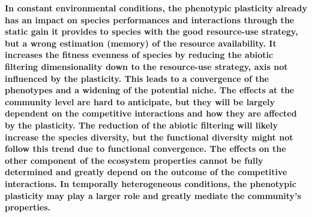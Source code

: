\begin{figure}\label{fig:rain_pl_effect}
    \classiccaptionstyle
{}
\end{figure}

\textbf{In constant environmental conditions, the phenotypic plasticity already has an impact on species performances and interactions through the static gain it provides to species with the good resource-use strategy, but a wrong estimation (memory) of the resource availability. It increases the fitness evenness of species by reducing the abiotic filtering dimensionality down to the resource-use strategy, axis not influenced by the plasticity. This leads to a convergence of the phenotypes and a widening of the potential niche. The effects at the community level are hard to anticipate, but they will be largely dependent on the competitive interactions and how they are affected by the plasticity. The reduction of the abiotic filtering will likely increase the species diversity, but the functional diversity might not follow this trend due to functional convergence. The effects on the other component of the ecosystem properties cannot be fully determined and greatly depend on the outcome of the competitive interactions. In temporally heterogeneous conditions, the phenotypic plasticity may play a larger role and greatly mediate the community's properties.}





